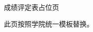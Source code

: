 \thispagestyle{empty}
\vspace*{\fill}
\begin{center}
  {\heiti{}成绩评定表占位页}

  \vspace{1cm}
  {\songti{}此页按照学院统一模板替换。}
\end{center}
\vspace*{\fill}
